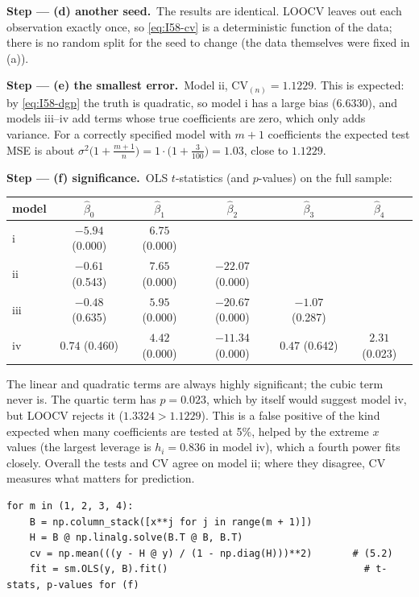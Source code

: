 \documentclass[11pt,a4paper]{article}
\numberwithin{equation}{questao}   %
\newcommand{\passo}[2]{\par\smallskip\noindent\textbf{Step --- #1.}~#2}
\begin{document}
\begin{sol}
\passo{(d) another seed}{The results are identical. LOOCV leaves out each observation exactly
once, so \eqref{eq:I58-cv} is a deterministic function of the data; there is no random split for
the seed to change (the data themselves were fixed in (a)).}

\passo{(e) the smallest error}{Model ii, $\mathrm{CV}_{(n)}=1.1229$. This is expected: by
\eqref{eq:I58-dgp} the truth is quadratic, so model i has a large bias (6.6330), and models
iii--iv add terms whose true coefficients are zero, which only adds variance. For a correctly
specified model with $m+1$ coefficients the expected test MSE is about
$\sigma^2\big(1+\tfrac{m+1}{n}\big)=1\cdot\big(1+\tfrac{3}{100}\big)=1.03$, close to $1.1229$.}

\passo{(f) significance}{OLS $t$-statistics (and $p$-values) on the full sample:
\begin{center}\begin{tabular}{lccccc}\toprule
model & $\hat\beta_0$ & $\hat\beta_1$ & $\hat\beta_2$ & $\hat\beta_3$ & $\hat\beta_4$\\\midrule
i   & $-5.94$ (0.000) & $6.75$ (0.000) & & & \\
ii  & $-0.61$ (0.543) & $7.65$ (0.000) & $-22.07$ (0.000) & & \\
iii & $-0.48$ (0.635) & $5.95$ (0.000) & $-20.67$ (0.000) & $-1.07$ (0.287) & \\
iv  & $0.74$ (0.460) & $4.42$ (0.000) & $-11.34$ (0.000) & $0.47$ (0.642) & $2.31$ (0.023)\\\bottomrule\end{tabular}\end{center}
The linear and quadratic terms are always highly significant; the cubic term never is. The
quartic term has $p=0.023$, which by itself would suggest model iv, but LOOCV rejects it
($1.3324>1.1229$). This is a false positive of the kind expected when many coefficients are
tested at 5\%, helped by the extreme $x$ values (the largest leverage is $h_i=0.836$ in model
iv), which a fourth power fits closely. Overall the tests and CV agree on model ii; where they
disagree, CV measures what matters for prediction.}

\begin{lstlisting}
for m in (1, 2, 3, 4):
    B = np.column_stack([x**j for j in range(m + 1)])
    H = B @ np.linalg.solve(B.T @ B, B.T)
    cv = np.mean(((y - H @ y) / (1 - np.diag(H)))**2)       # (5.2)
    fit = sm.OLS(y, B).fit()                                  # t-stats, p-values for (f)
\end{lstlisting}


\end{sol}
\end{document}
